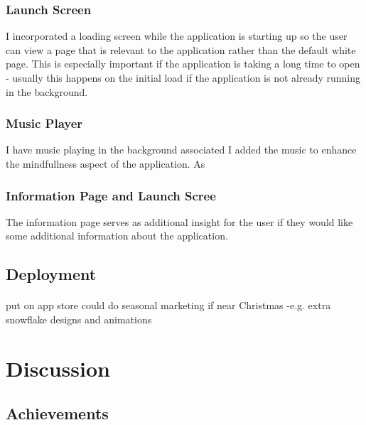 \documentclass[11pt]{article}
\begin{document}
                 \subsubsection{Launch Screen}
                I incorporated a loading screen while the application is starting up so the user can view a page that is relevant to the application rather than the default white page. This is especially important if the application is taking a long time to open - usually this happens on the initial load if the application is not already running in the background.
                
                 \subsubsection{Music Player}
                I have music playing in the background associated
                I added the music to enhance the mindfullness aspect of the application. As 
                
                
                 \subsubsection{Information Page and Launch Scree}
                
                The information page serves as additional insight for the user if they would like some additional information about the application. 


    \subsection{Deployment}
        \paragraph{}
        put on app store
        could do seasonal marketing if near Christmas -e.g. extra snowflake designs and animations
        
    
\newpage
\section{Discussion}
    \paragraph{}

    
    \subsection{Achievements}
    
\end{document}
